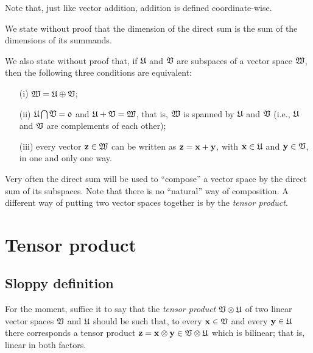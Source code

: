 Note that, just like vector addition, addition is defined coordinate-wise.

We state without proof
that the dimension of the direct sum is the sum of the dimensions of its summands.

We also state without proof
that,
if
${\frak U}$
and
${\frak V}$
are subspaces of a vector space
${\frak W}$,
then the following three conditions are equivalent:
\begin{itemize}
\item[(i)]
${\frak W}={\frak U}\oplus{\frak V}$;
\item[(ii)]
${\frak U}\bigcap{\frak V}={\frak 0}$
and
${\frak U}+{\frak V}={\frak W}$, that is, ${\frak W}$ is spanned by ${\frak U}$ and ${\frak V}$
(i.e., ${\frak U}$
and
${\frak V}$
are complements of each other);
\item[(iii)]
every vector ${\bf z}\in {\frak W}$ can be written as
${\bf z}={\bf x}+{\bf y}$, with
${\bf x}\in {\frak U}$  and
${\bf y}\in {\frak V}$, in one and only one way.
\end{itemize}

Very often the direct sum will be used to ``compose'' a vector space by the direct sum of its subspaces.
Note that there is no ``natural'' way of composition.
A different way of putting two vector spaces together is by the {\em tensor product}.


\section{Tensor product}
\label{2011-m-tensorp}


\subsection{Sloppy definition}

For the moment, suffice it to say that
the {\em tensor product}
 ${\frak V} \otimes {\frak U}$
of two linear vector spaces  ${\frak V}$ and  ${\frak U}$
should be such that,
to every
${\bf x} \in  {\frak V}$
and every
${\bf y} \in  {\frak U}$
there corresponds a tensor product ${\bf z} = {\bf x} \otimes {\bf y}
\in {\frak V} \otimes {\frak U}$
which is bilinear; that is, linear in both factors.

